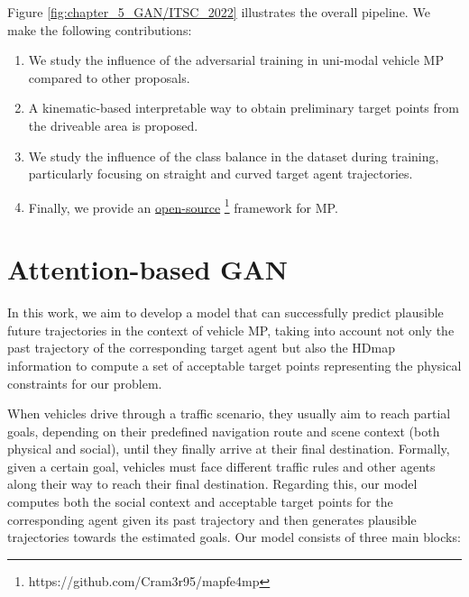 Figure \ref{fig:chapter_5_GAN/ITSC_2022} illustrates the overall pipeline. We make the following contributions:

\begin{enumerate}
	\item We study the influence of the adversarial training in uni-modal vehicle \ac{MP} compared to other proposals. 
	\item A kinematic-based interpretable way to obtain preliminary target points from the driveable area is proposed.
	\item We study the influence of the class balance in the dataset during training, particularly focusing on straight and curved target agent trajectories.
	\item Finally, we provide an \href{https://github.com/Cram3r95/mapfe4mp}{open-source} \footnote{https://github.com/Cram3r95/mapfe4mp} framework for \ac{MP}.
\end{enumerate}

\section{Attention-based GAN}
\label{sec:5_attention_gan}

In this work, we aim to develop a model \cite{gomez2022exploring} that can successfully predict plausible future trajectories in the context of vehicle \ac{MP}, taking into account not only the past trajectory of the corresponding target agent but also the \ac{HDmap} information to compute a set of acceptable target points representing the physical constraints for our problem.

When vehicles drive through a traffic scenario, they usually aim to reach partial goals, depending on their predefined navigation route and scene context (both physical and social), until they finally arrive at their final destination. Formally, given a certain goal, vehicles must face different traffic rules and other agents along their way to reach their final destination. Regarding this, our model computes both the social context and acceptable target points for the corresponding agent given its past trajectory and then generates plausible trajectories towards the estimated goals. Our model consists of three main blocks:


